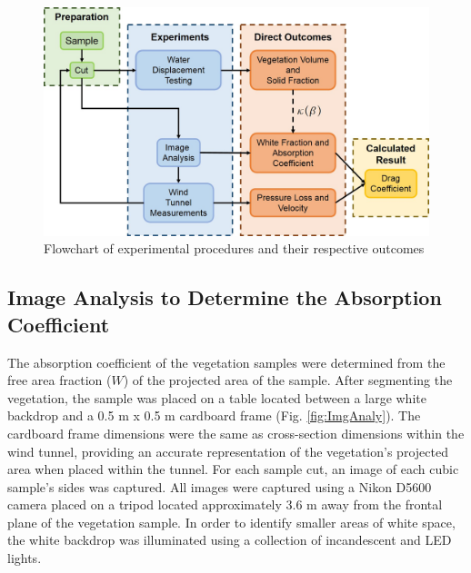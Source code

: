 \documentclass[12pt]{article}
\begin{document}
\begin{figure} [!]
	\centering 	\includegraphics[width=1.0\linewidth]{Picture4.jpg}
	\caption{Flowchart of experimental procedures and their respective outcomes}
	\label{fig:flowchart}
\end{figure}



\subsection{Image Analysis to Determine the Absorption Coefficient }
\label{ssec:headingscap}

The absorption coefficient of the vegetation samples were determined from the free area fraction ($W$) of the projected area of the sample. After segmenting the vegetation, the sample was placed on a table located between a large white backdrop and a 0.5 m x 0.5 m cardboard frame (Fig. \ref{fig:ImgAnaly}). The cardboard frame dimensions were the same as cross-section dimensions within the wind tunnel, providing an accurate representation of the vegetation's projected area when placed within the tunnel. For each sample cut, an image of each cubic sample's sides was captured. All images were captured using a Nikon D5600 camera placed on a tripod located approximately 3.6 \si{m} away from the frontal plane of the vegetation sample. In order to identify smaller areas of white space, the white backdrop was illuminated using a collection of incandescent and LED lights.\\
\end{document}
